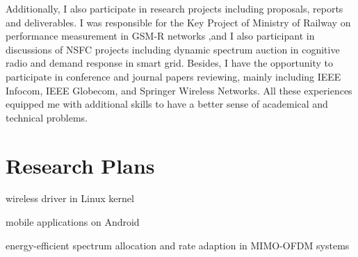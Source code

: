 \documentclass{article}
\begin{document}
Additionally, I also participate in research projects including proposals, reports and deliverables. I was responsible for the Key Project of Ministry of Railway on performance measurement in GSM-R networks ,and I also participant in discussions of NSFC projects including dynamic spectrum auction in cognitive radio and demand response in smart grid. Besides, I have the opportunity to participate in conference and journal papers reviewing, mainly including IEEE Infocom, IEEE Globecom, and Springer Wireless Networks. All these experiences equipped me with additional skills to have a better sense of academical and technical problems.

\section{Research Plans}
wireless driver in Linux kernel

mobile applications on Android

energy-efficient spectrum allocation and rate adaption in MIMO-OFDM systems
\end{document}
